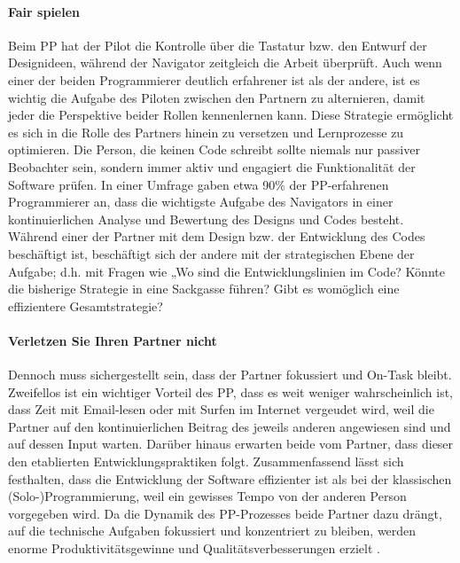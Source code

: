 \paragraph  {Fair spielen} Beim PP hat der Pilot die Kontrolle über die Tastatur bzw. den Entwurf der Designideen, während der Navigator zeitgleich die Arbeit überprüft. Auch wenn einer der beiden Programmierer deutlich erfahrener ist als der andere, ist es wichtig die Aufgabe des Piloten zwischen den Partnern zu alternieren, damit jeder die Perspektive beider Rollen kennenlernen kann. Diese Strategie ermöglicht es sich in die Rolle des Partners hinein zu versetzen und Lernprozesse zu optimieren.
Die Person, die keinen Code schreibt sollte niemals nur passiver Beobachter sein, sondern immer aktiv und engagiert die Funktionalität der Software prüfen. In einer Umfrage gaben etwa 90\% der PP-erfahrenen Programmierer an, dass die wichtigste Aufgabe des Navigators in einer kontinuierlichen Analyse und Bewertung des Designs und Codes besteht. Während einer der Partner mit dem Design bzw. der Entwicklung des Codes beschäftigt ist, beschäftigt sich der andere mit der strategischen Ebene der Aufgabe; d.h. mit Fragen wie „Wo sind die Entwicklungslinien im Code? Könnte die bisherige Strategie in eine Sackgasse führen? Gibt es womöglich eine effizientere Gesamtstrategie? \cite{Williams2000AllKindergarten}

\paragraph{ Verletzen Sie Ihren Partner nicht} Dennoch muss sichergestellt sein, dass der Partner fokussiert und On-Task bleibt. Zweifellos ist ein wichtiger Vorteil des PP, dass es weit weniger wahrscheinlich ist, dass Zeit mit Email-lesen oder mit Surfen im Internet vergeudet wird, weil die Partner auf den kontinuierlichen Beitrag des jeweils anderen angewiesen sind und auf dessen Input warten. Darüber hinaus erwarten beide vom Partner, dass dieser den etablierten Entwicklungspraktiken folgt.
Zusammenfassend lässt sich festhalten, dass die Entwicklung der Software effizienter ist als bei der klassischen (Solo-)Programmierung, weil ein gewisses Tempo von der anderen Person vorgegeben wird. Da die Dynamik des PP-Prozesses beide Partner dazu drängt, auf die technische Aufgaben fokussiert und konzentriert zu bleiben, werden enorme Produktivitätsgewinne und Qualitätsverbesserungen erzielt \cite{Williams2000AllKindergarten}.


